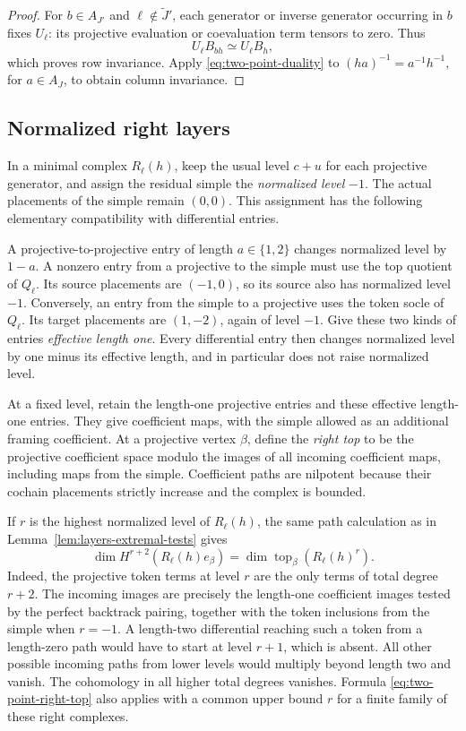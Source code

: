 \begin{proof}
For \(b\in A_{J'}\) and \(\ell\notin\widetilde J'\), each generator
or inverse generator occurring in \(b\) fixes \(U_\ell\): its
projective evaluation or coevaluation term tensors to zero.  Thus
\[
 U_\ell B_{bh}\simeq U_\ell B_h,
\]
which proves row invariance.  Apply
\eqref{eq:two-point-duality} to \((ha)^{-1}=a^{-1}h^{-1}\), for
\(a\in A_J\), to obtain column invariance.
\end{proof}

\subsection{Normalized right layers}

In a minimal complex \(R_\ell(h)\), keep the usual level \(c+u\) for
each projective generator, and assign the residual simple the
\emph{normalized level} \(-1\).  The actual placements of the simple
remain \((0,0)\).  This assignment has the following elementary
compatibility with differential entries.

A projective-to-projective entry of length \(a\in\{1,2\}\) changes
normalized level by \(1-a\).  A nonzero entry from a projective to
the simple must use the top quotient of \(Q_\ell\).  Its source
placements are \((-1,0)\), so its source also has normalized level
\(-1\).  Conversely, an entry from the simple to a projective uses
the token socle of \(Q_\ell\).  Its target placements are
\((1,-2)\), again of level \(-1\).  Give these two kinds of entries
\emph{effective length one}.  Every differential entry then changes
normalized level by one minus its effective length, and in particular
does not raise normalized level.

At a fixed level, retain the length-one projective entries and these
effective length-one entries.  They give coefficient maps, with the
simple allowed as an additional framing coefficient.  At a
projective vertex \(\beta\), define the \emph{right top} to be the
projective coefficient space modulo the images of all incoming
coefficient maps, including maps from the simple.  Coefficient paths
are nilpotent because their cochain placements strictly increase and
the complex is bounded.

If \(r\) is the highest normalized level of \(R_\ell(h)\), the same
path calculation as in Lemma~\ref{lem:layers-extremal-tests} gives
\begin{equation}
\label{eq:two-point-right-top}
 \dim H^{r+2}(R_\ell(h)e_\beta)
       =\dim\operatorname{top}_\beta(R_\ell(h)^r).
\end{equation}
Indeed, the projective token terms at level \(r\) are the only terms
of total degree \(r+2\).  The incoming images are precisely the
length-one coefficient images tested by the perfect backtrack
pairing, together with the token inclusions from the simple when
\(r=-1\).  A length-two differential reaching such a token from a
length-zero path would have to start at level \(r+1\), which is
absent.  All other possible incoming paths from lower levels would
multiply beyond length two and vanish.  The cohomology in
all higher total degrees vanishes.  Formula
\eqref{eq:two-point-right-top} also applies with a common upper bound
\(r\) for a finite family of these right complexes.

